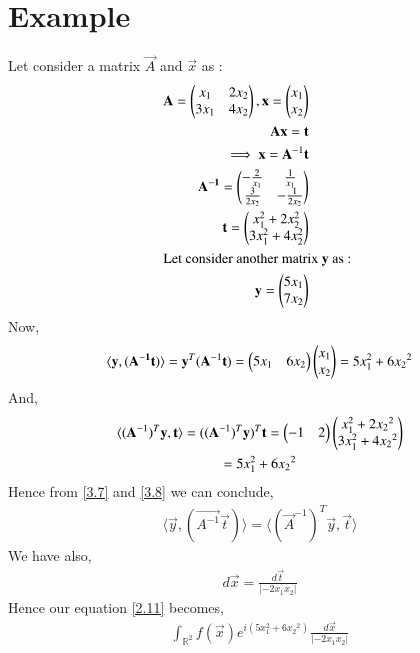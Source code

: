 \documentclass[journal,12pt,twocolumn]{IEEEtran}
\numberwithin{table}{section}
\begin{document}
\section{Example}
Let consider a matrix $\vec{A}$ and $\vec{x}$ as :
\begin{align}
\mathbf{A} = \begin{pmatrix}x_1 & 2x_2 \\ 3x_1  & 4x_2\end{pmatrix}, \mathbf{x} = \begin{pmatrix}x_1 \\x_2\end{pmatrix}\\
\mathbf{A}\mathbf{x} = \mathbf{t}\\
\implies \mathbf{x} = \mathbf{A}^{-1}\mathbf{t}\\
\mathbf{A^{-1}} =\begin{pmatrix}-\frac{2}{x_1} & \frac{1}{x_1} \\ \frac{3}{2x_2} & -\frac{1}{2x_2}\end{pmatrix}\\
\mathbf{t} = \begin{pmatrix}x_1^2 + 2x_2^2 \\ 3x_1^2 + 4x_2^2\end{pmatrix}\\
\intertext{Let consider another matrix $\mathbf{y}$ as : }
\mathbf{y} = \begin{pmatrix}5x_1 \\7x_2\end{pmatrix}
\end{align}
Now,
\begin{multline}
\langle \mathbf{y},(\mathbf{A^{-1}}\mathbf{t}) \rangle =\mathbf{y}^T(\mathbf{A}^{-1}\mathbf{t}) = \begin{pmatrix}5x_1 & 6{x_2}\end{pmatrix}\begin{pmatrix}x_1 \\ x_2\end{pmatrix}  = 5x_1^2 + 6{x_2}^2 \label{3.7}
\end{multline}
And,
\begin{multline}
\langle   (\mathbf{A}^{-1})^T\mathbf{y}, \mathbf{t} \rangle = ((\mathbf{A}^{-1})^T\mathbf{y})^T \mathbf{t} = \begin{pmatrix}-1 & 2\end{pmatrix}\begin{pmatrix}x_1^2 +2{x_2}^2 \\3x_1^2 +4{x_2}^2\end{pmatrix}\\ = 5x_1^2 + 6{x_2}^2 \label{3.8}
\end{multline}
Hence from \eqref{3.7} and \eqref{3.8} we can conclude,
\begin{align}
 \langle \vec{y},(\vec{A^{-1}}\vec{t}) \rangle = \langle (\vec{A}^{-1})^T\vec{y}, \vec{t} \rangle
\end{align}
 We have also, 
 \begin{align}
 d\vec{x} = \frac{d\vec{t}}{  \left | -2x_1x_2 \right|}
 \end{align}
 Hence our equation \eqref{2.11} becomes,
 \begin{align}
 \int_{\mathbb{R}^2} f(\vec{x}) e^{i(5x_1^2 + 6{x_2}^2)}\frac{d\vec{x}}{  \left | -2x_1x_2 \right|}
 \end{align}

 
\end{document}
